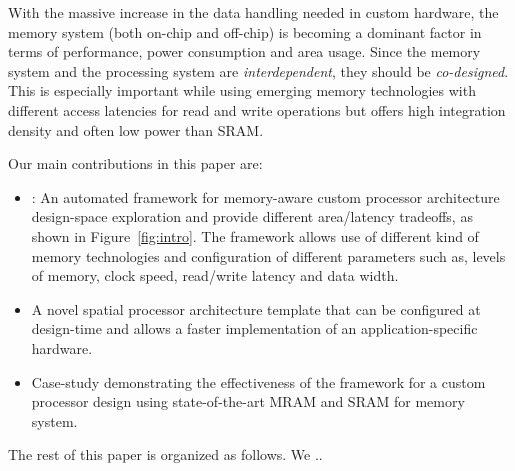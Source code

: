 With the massive increase in the data handling needed in custom hardware, the memory system (both on-chip and off-chip) is becoming a dominant factor in terms of performance, power consumption and area usage. Since the memory system and the processing system are \textit{interdependent}, they should be \textit{co-designed}. This is especially important while using emerging memory technologies with different access latencies for read and write operations but offers high integration density and often low power than SRAM.

Our main contributions in this paper are:
\begin{itemize}
\item \frameworkname: An automated framework for memory-aware custom processor architecture design-space exploration and provide different area/latency tradeoffs, as shown in Figure~\ref{fig:intro}. The framework allows use of different kind of memory technologies and configuration of different parameters such as, levels of memory, clock speed, read/write latency and data width. 
\item A novel spatial processor architecture template that can be configured at design-time and allows a faster implementation of an application-specific hardware.
\item Case-study demonstrating the effectiveness of the framework for a custom processor design using state-of-the-art MRAM and SRAM for memory system.




\end{itemize}


The rest of this paper is organized as follows. We ..


